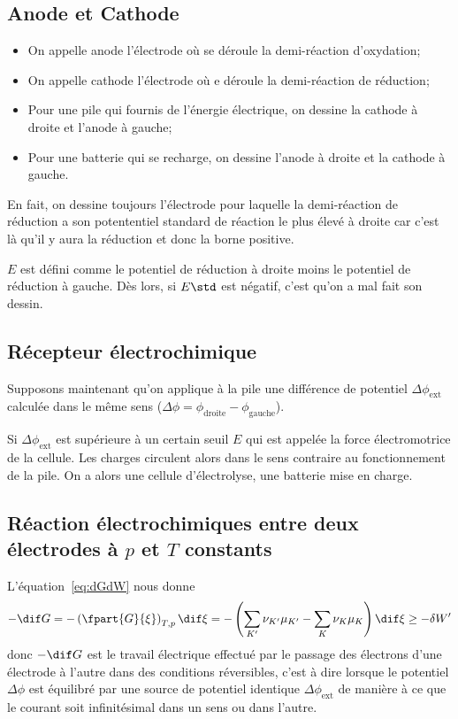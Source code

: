 \subsection{Anode et Cathode}
\begin{itemize}
  \item On appelle anode l'électrode où
    se déroule la demi-réaction d'oxydation;
  \item On appelle cathode l'électrode où
    e déroule la demi-réaction de réduction;
  \item Pour une pile qui fournis de l'énergie électrique,
    on dessine la cathode à droite et l'anode à gauche;
  \item Pour une batterie qui se recharge,
    on dessine l'anode à droite et la cathode à gauche.
\end{itemize}
En fait, on dessine toujours l'électrode pour laquelle la demi-réaction
de réduction a son potententiel standard de réaction le plus élevé à
droite car c'est là qu'il y aura la réduction et donc la borne positive.

$E$ est défini comme le potentiel de réduction à droite moins
le potentiel de réduction à gauche.
Dès lors, si $E\std$ est négatif, c'est qu'on a mal fait son dessin.

\subsection{Récepteur électrochimique}
Supposons maintenant qu'on applique à la pile une différence
de potentiel $\Delta \phi_\mathrm{ext}$ calculée dans le même sens
($\Delta \phi = \phi_\mathrm{droite} - \phi_\mathrm{gauche}$).

Si $\Delta \phi_\mathrm{ext}$ est supérieure à un certain seuil $E$
qui est appelée la force électromotrice de la cellule.
Les charges circulent alors dans le sens contraire au fonctionnement de la pile.
On a alors une cellule d'électrolyse, une batterie mise en charge.

\subsection{Réaction électrochimiques entre
deux électrodes à $p$ et $T$ constants}
L'équation~\eqref{eq:dGdW} nous donne
\[ -\dif G = -\left(\fpart{G}{\xi }\right)_{T,p}\dif\xi =
  -\left(\sum_{K'}\nu_{K'}\mu_{K'}-
\sum_{K}\nu_{K}\mu_{K}\right)\dif\xi \geq - \delta W' \]
donc $-\dif G$ est le travail électrique effectué par le passage des électrons
d'une électrode à l'autre dans des conditions réversibles,
c'est à dire lorsque le potentiel $\Delta \phi$ est équilibré par une source
de potentiel identique $\Delta \phi_\mathrm{ext}$
de manière à ce que le courant soit
infinitésimal dans un sens ou dans l'autre.


